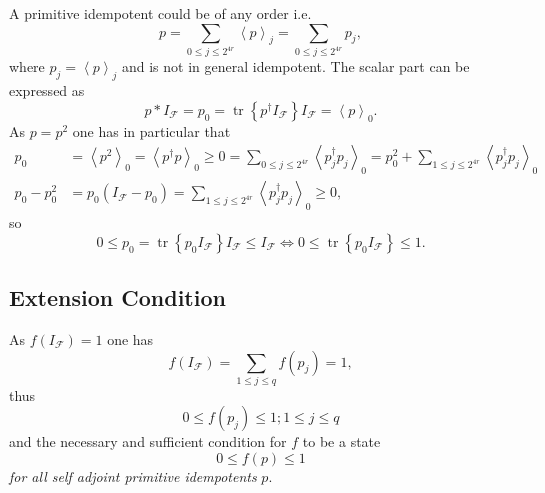 \documentclass[aps,preprint]{revtex4}%
\begin{document}
A primitive idempotent could be of any order i.e.
\begin{equation}
p=\sum_{0\leq j\leq2^{4r}}\left\langle p\right\rangle _{j}=\sum_{0\leq
j\leq2^{4r}}p_{j},
\end{equation}
where $p_{j}=\left\langle p\right\rangle _{j}$ and is not in general
idempotent. The scalar part can be expressed as
\begin{equation}
p\ast I_{\mathcal{F}}=p_{0}=\operatorname*{tr}\left\{  p^{\dagger
}I_{\mathcal{F}}\right\}  I_{\mathcal{F}}=\left\langle p\right\rangle _{0}.
\end{equation}
As $p=p^{2}$ one has in particular that
\begin{align}
p_{0}  &  =\left\langle p^{2}\right\rangle _{0}=\left\langle p^{\dagger
}p\right\rangle _{0}\geq0=\sum_{0\leq j\leq2^{4r}}\left\langle p_{j}^{\dagger
}p_{j}\right\rangle _{0}=p_{0}^{2}+\sum_{1\leq j\leq2^{4r}}\left\langle
p_{j}^{\dagger}p_{j}\right\rangle _{0}\\
p_{0}-p_{0}^{2}  &  =p_{0}\left(  I_{\mathcal{F}}-p_{0}\right)  =\sum_{1\leq
j\leq2^{4r}}\left\langle p_{j}^{\dagger}p_{j}\right\rangle _{0}\geq0,
\end{align}
so
\begin{equation}
0\leq p_{0}=\operatorname*{tr}\left\{  p_{0}I_{\mathcal{F}}\right\}
I_{\mathcal{F}}\leq I_{\mathcal{F}}\Longleftrightarrow0\leq\operatorname*{tr}%
\left\{  p_{0}I_{\mathcal{F}}\right\}  \leq1.
\end{equation}


\subsection{Extension Condition}

As $f\left(  I_{\mathcal{F}}\right)  =1$ one has
\begin{equation}
f\left(  I_{\mathcal{F}}\right)  =\sum_{1\leq j\leq q}f\left(  p_{j}\right)
=1,
\end{equation}
thus
\begin{equation}
0\leq f\left(  p_{j}\right)  \leq1;1\leq j\leq q
\end{equation}
and the necessary and sufficient condition for $f$ to be a state
\begin{equation}
0\leq f\left(  p\right)  \leq1
\end{equation}
\emph{for all self adjoint primitive idempotents }$p.$
\end{document}
